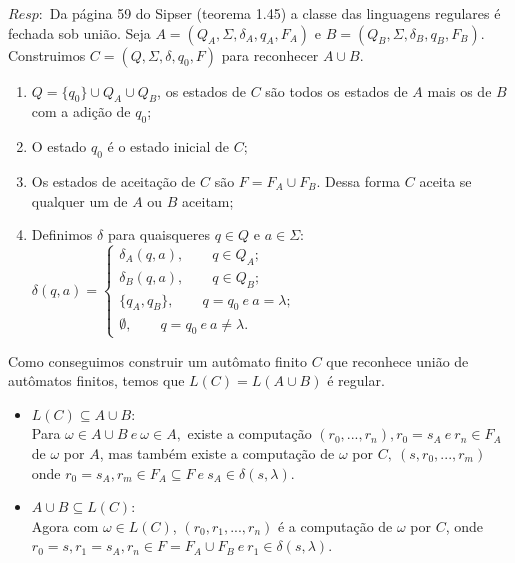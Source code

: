 \documentclass{homework}
\begin{document}
	$Resp:$ Da página 59 do Sipser (teorema 1.45) a classe das linguagens regulares é fechada sob união.
	Seja $A =(Q_A,\Sigma,\delta_A,q_A,F_A)$ e $B = (Q_B,\Sigma,\delta_B,q_B,F_B)$.\\
	Construimos $C = (Q,\Sigma,\delta,q_0,F)$ para reconhecer $A \cup B$.
	\begin{enumerate}
		\item $Q = \{q_0\} \cup Q_A \cup Q_B$, os estados de $C$ são todos os estados de $A$ mais os de $B$ com a adição de $q_0$;
		\item O estado $q_0$ é o estado inicial de $C$;
		\item Os estados de aceitação de $C$ são $F = F_A \cup F_B$. Dessa forma $C$ aceita se qualquer um de $A$ ou $B$ aceitam;
		\item Definimos $\delta$ para quaisqueres $q \in Q$ e $a \in \Sigma$:\\
		$\delta(q,a) = \begin{cases}
							\delta_A(q,a),\qquad q \in Q_A;\\
							\delta_B(q,a),\qquad q \in Q_B;\\
							\{q_A,q_B\},\qquad q = q_0 \ e \ a = \lambda;\\
							\emptyset, \qquad  q = q_0 \ e \ a \neq \lambda.
					   \end{cases}					  
		$
	\end{enumerate}
	Como conseguimos construir um autômato finito $C$ que reconhece união de autômatos finitos, temos que $L(C) = L(A \cup B)$ é regular.
	\begin{itemize}
		\item $L(C) \subseteq A \cup B$:\\
			Para $\omega \in A \cup B \ e\ \omega \in A,$ existe a computação $(r_0,...,r_n),r_0=s_A\ e\ r_n \in F_A$ de $\omega$ por $A$, mas também existe a computação de $\omega$ por $C,\ (s,r_0,...,r_m)$ onde $r_0=s_A,r_m \in F_A \subseteq F\ e\ s_A \in \delta(s,\lambda)$.
		\item $A \cup B \subseteq L(C)$:\\
			Agora com $\omega \in L(C)$, $(r_0,r_1,...,r_n)$ é a computação de $\omega$ por $C$, onde $r_0=s, r_1=s_A, r_n \in F = F_A \cup F_B\ e\ r_1 \in \delta(s,\lambda)$.
	\end{itemize}

\end{document}
